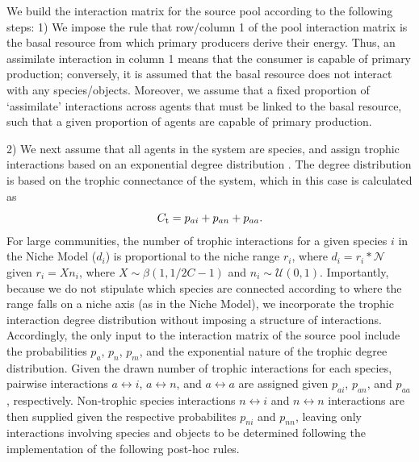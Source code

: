 \documentclass[twocolumn,preprintnumbers,amsmath,amssymb,superscriptaddress]{revtex4}
\begin{document}
We build the interaction matrix for the source pool according to the following steps:
1) We impose the rule that row/column 1 of the pool interaction matrix is the basal resource from which primary producers derive their energy.
Thus, an assimilate interaction in column 1 means that the consumer is capable of primary production; conversely, it is assumed that the basal resource does not interact with any species/objects.
Moreover, we assume that a fixed proportion of `assimilate' interactions across agents that must be linked to the basal resource, such that a given proportion of agents are capable of primary production.

2) We next assume that all agents in the system are species, and assign trophic interactions based on an exponential degree distribution \cite{Williams:2000wt}.
The degree distribution is based on the trophic connectance of the system, which in this case is calculated as 
\begin{equation}
  C_{\rm t} = p_{ai}+p_{an}+p_{aa}.
\end{equation}
For large communities, the number of trophic interactions for a given species $i$ in the Niche Model ($d_i$) is proportional to the niche range $r_i$, where $d_i = r_i*\mathcal{N}$ given $r_i = Xn_i$, where $X \sim \beta(1,1/2C - 1)$ and $n_i \sim \mathcal{U}(0,1)$. %
Importantly, because we do not stipulate which species are connected according to where the range falls on a niche axis (as in the Niche Model), we incorporate the trophic interaction degree distribution without imposing a structure of interactions.
Accordingly, the only input to the interaction matrix of the source pool include the probabilities $p_a$, $p_n$, $p_m$, and the exponential nature of the trophic degree distribution.
Given the drawn number of trophic interactions for each species, pairwise interactions $a \leftrightarrow i$, $a \leftrightarrow n$, and $a \leftrightarrow a$ are assigned given $p_{ai}$, $p_{an}$, and $p_{aa}$, respectively.
Non-trophic species interactions $n \leftrightarrow i$ and $n \leftrightarrow n$ interactions are then supplied given the respective probabilites $p_{ni}$ and $p_{nn}$, leaving only interactions involving species and objects to be determined following the implementation of the following post-hoc rules.
\end{document}

